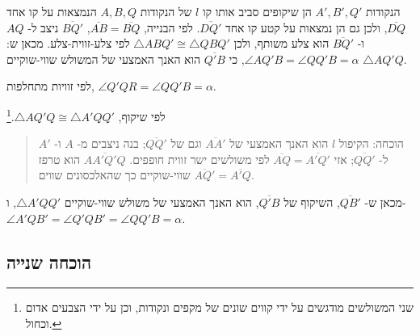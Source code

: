 \begin{center}
\end{center}

הנקודות
$A', B', Q'$
הן שיקופים סביב אותו קו 
$l$
של הנקודות
$A,B,Q$
הנמצאות על קו אחד
$\overline{DQ}$,
ולכן גם הן נמצאות על קטע קו אחד
$\overline{DQ'}$.
לפי הבנייה,
$\overline{AB}=\overline{BQ}$, $\overline{BQ'}$
ניצב ל-%
$AQ$
ו-%
$\overline{BQ'}$
הוא צלע משותף, ולכן
$\triangle ABQ'\cong \triangle QBQ'$ 
לפי צלע-זווית-צלע. מכאן ש:
$\angle AQ'B=\angle QQ'B=\alpha$,
כי
$\overline{Q'B}$
הוא האנך האמצעי של המשולש שווי-שוקיים
$\triangle AQ'Q$.

לפי זוויות מתחלפות,
$\angle Q'QR=\angle QQ'B=\alpha$.

לפי שיקוף,
$\triangle AQ'Q\cong \triangle A'QQ'$.\footnote{%
שני המשולשים מודגשים על ידי קווים שונים של מקפים ונקודות, וכן על ידי הצבעים אדום וכחול.%
}
\begin{quote}
הוכחה: הקיפול
$l$
הוא האנך האמצעי של 
$\overline{AA'}$
וגם של
$\overline{QQ'}$;
בנה ניצבים מ-%
$A$
ו-%
$A'$
ל-%
$\overline{QQ'}$;
אזי
$\overline{AQ}=\overline{A'Q'}$
לפי משולשים ישר זווית חופפים.
$\overline{AA'Q'Q}$
הוא טרפז שווי-שוקיים כך שהאלכסונים שווים
$\overline{AQ'}=\overline{A'Q}$.
\end{quote}
מכאן ש-%
$\overline{QB'}$,
השיקוף של
$\overline{Q'B}$,
הוא האנך האמצעי של משולש שווי-שוקיים
$\triangle A'QQ'$,
ו-%
$\angle A'QB'=\angle Q'QB'=\angle QQ'B=\alpha$.

\subsection{הוכחה שנייה}

